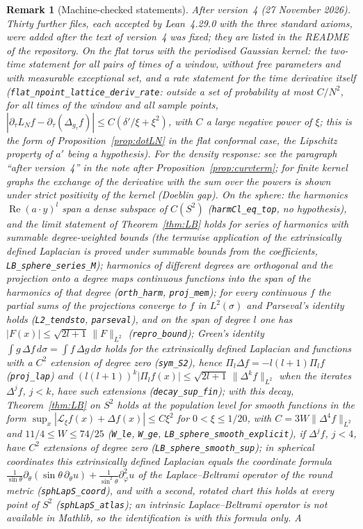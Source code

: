 \documentclass[11pt,a4paper]{article}
\theoremstyle{stmt}
\theoremstyle{defn}
\theoremstyle{rmk}
\newtheorem{remark}[theorem]{Remark}
\numberwithin{equation}{section}
\begin{document}
{\begin{remark}[Machine-checked statements]
\smallskip\noindent\emph{After version~4 (27 November 2026).} Thirty further files, each accepted by Lean~4.29.0 with the three standard axioms, were added after the text of version~4 was fixed; they are listed in the README of the repository. On the flat torus with the periodised Gaussian kernel: the two-time statement for all pairs of times of a window, without free parameters and with measurable exceptional set, and a rate statement for the time derivative itself (\texttt{flat\_npoint\_lattice\_deriv\_rate}: outside a set of probability at most $C/N^2$, for all times of the window and all sample points, $|\partial_\tau L_Nf-\partial_\tau(\Delta_{g_\tau}f)|\le C(\delta'/\xi+\xi^2)$, with $C$ a large negative power of $\xi$; this is the form of Proposition~\ref{prop:dotLN} in the flat conformal case, the Lipschitz property of $a'$ being a hypothesis). For the density response: see the paragraph ``after version~4'' in the note after Proposition~\ref{prop:curvterm}; for finite kernel graphs the exchange of the derivative with the sum over the powers is shown under strict positivity of the kernel (Doeblin gap). On the sphere: the harmonics $\operatorname{Re}(a\cdot y)^l$ span a dense subspace of $C(S^2)$ (\texttt{harmCl\_eq\_top}, no hypothesis), and the limit statement of Theorem~\ref{thm:LB} holds for series of harmonics with summable degree-weighted bounds (the termwise application of the extrinsically defined Laplacian is proved under summable bounds from the coefficients, \texttt{LB\_sphere\_series\_M}); harmonics of different degrees are orthogonal and the projection onto a degree maps continuous functions into the span of the harmonics of that degree (\texttt{orth\_harm}, \texttt{proj\_mem}); for every continuous $f$ the partial sums of the projections converge to $f$ in $L^2(\sigma)$ and Parseval's identity holds (\texttt{L2\_tendsto}, \texttt{parseval}), and on the span of degree $l$ one has $|F(x)|\le\sqrt{2l+1}\,\|F\|_{L^2}$ (\texttt{repro\_bound}); Green's identity $\int g\,\Delta f\,d\sigma=\int f\,\Delta g\,d\sigma$ holds for the extrinsically defined Laplacian and functions with a $C^2$ extension of degree zero (\texttt{sym\_S2}), hence $\Pi_l\Delta f=-l(l+1)\Pi_l f$ (\texttt{proj\_lap}) and $(l(l+1))^k|\Pi_lf(x)|\le\sqrt{2l+1}\,\|\Delta^kf\|_{L^2}$ when the iterates $\Delta^jf$, $j<k$, have such extensions (\texttt{decay\_sup\_fin}); with this decay, Theorem~\ref{thm:LB} on $S^2$ holds at the population level for smooth functions in the form $\sup_x|\mathcal L_\xi f(x)+\Delta f(x)|\le C\xi^2$ for $0<\xi\le1/20$, with $C=3W\|\Delta^4f\|_{L^2}$ and $11/4\le W\le74/25$ (\texttt{W\_le}, \texttt{W\_ge}, \texttt{LB\_sphere\_smooth\_explicit}), if $\Delta^jf$, $j<4$, have $C^2$ extensions of degree zero (\texttt{LB\_sphere\_smooth\_sup}); in spherical coordinates this extrinsically defined Laplacian equals the coordinate formula $\frac1{\sin\theta}\partial_\theta(\sin\theta\,\partial_\theta u)+\frac1{\sin^2\theta}\partial_\varphi^2u$ of the Laplace--Beltrami operator of the round metric (\texttt{sphLapS\_coord}), and with a second, rotated chart this holds at every point of $S^2$ (\texttt{sphLapS\_atlas}); an intrinsic Laplace--Beltrami operator is not available in Mathlib, so the identification is with this formula only. A 
\end{remark}}
\end{document}
